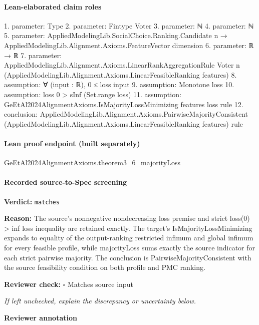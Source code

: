 \documentclass[10pt]{article}
\newcommand{\reviewerbox}{%
  \par\noindent\fbox{\parbox{0.96\linewidth}{\rule{0pt}{0.38in}}}\par
}
\newcommand{\reviewmatch}[1]{%
  \par\noindent\textbf{Reviewer check:} $\square$\; #1\par
  \noindent\emph{If left unchecked, explain the discrepancy or uncertainty below.}\par
}
\begin{document}
\paragraph{Lean-elaborated claim roles}\begin{ReviewVerbatim}
1. parameter: Type
2. parameter: Fintype Voter
3. parameter: ℕ
4. parameter: ℕ
5. parameter: AppliedModelingLib.SocialChoice.Ranking.Candidate n → AppliedModelingLib.Alignment.Axioms.FeatureVector dimension
6. parameter: ℝ → ℝ
7. parameter: AppliedModelingLib.Alignment.Axioms.LinearRankAggregationRule Voter n
  (AppliedModelingLib.Alignment.Axioms.LinearFeasibleRanking features)
8. assumption: ∀ (input : ℝ), 0 ≤ loss input
9. assumption: Monotone loss
10. assumption: loss 0 > sInf (Set.range loss)
11. assumption: GeEtAl2024AlignmentAxioms.IsMajorityLossMinimizing features loss rule
12. conclusion: AppliedModelingLib.Alignment.Axioms.PairwiseMajorityConsistent
  (AppliedModelingLib.Alignment.Axioms.LinearFeasibleRanking features) rule
\end{ReviewVerbatim}

\paragraph{Lean proof endpoint (built separately)}\begin{ReviewVerbatim}
GeEtAl2024AlignmentAxioms.theorem3_6_majorityLoss
\end{ReviewVerbatim}

\paragraph{Recorded source-to-Spec screening}
\textbf{Verdict:} \texttt{matches}
\\
{\raggedright
\textbf{Reason:} The source's nonnegative nondecreasing loss premise and strict loss(0) > inf loss inequality are retained exactly.\allowbreak{}  The target's IsMajorityLossMinimizing expands to equality of the output-\allowbreak{}ranking restricted infimum and global infimum for every feasible profile, while majorityLoss sums exactly the source indicator for each strict pairwise majority.\allowbreak{}  The conclusion is PairwiseMajorityConsistent with the source feasibility condition on both profile and PMC ranking.\allowbreak{}
\par}
\reviewmatch{Matches source input}
\noindent\textbf{Reviewer annotation}\par
\reviewerbox
\clearpage
\hypertarget{source-claim-11bcc2903523a4df}{}
\end{document}
